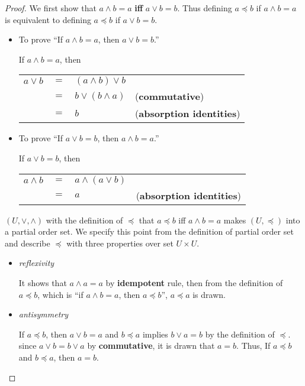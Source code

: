 \begin{proof}
\label{prf:latticeTheorem2}
We first show that $a \wedge b = a$ \textbf{iff} $a \vee b = b$. Thus defining $a \preceq b$ if $a \wedge b = a$ is equivalent to defining $a \preceq b$ if $a \vee b = b$.
\begin{itemize}

\item To prove ``If $a \wedge b = a$, then $a \vee b = b$.''

If $a \wedge b = a$, then 

\begin{tabular}{l l l l}
$a \vee b$ & $ = $ & $(a \wedge b) \vee b$ & \\
           & $ = $ & $b \vee (b \wedge a)$ & (\textbf{commutative})\\
           & $ = $ & $b$ & (\textbf{absorption identities})  
\end{tabular}

\item To prove ``If $a \vee b = b$, then $a \wedge b = a$.''

If $a \vee b = b$, then

\begin{tabular}{l l l l}
$a \wedge b$ & $ = $ & $a \wedge (a \vee b)$ & \\
             & $ = $ & $a$ & (\textbf{absorption identities})
\end{tabular}
\end{itemize}

$(U,\vee,\wedge)$ with the definition of $\preceq$ that $a \preceq b$ iff $a \wedge b = a$ makes $(U,\preceq)$ into a partial order set. We specify this point from the definition of partial order set and describe $\preceq$ with three properties over set $U \times U$.
\begin{itemize}

\item \textit{reflexivity}
 
It shows that $a \wedge a = a$ by \textbf{idempotent} rule, then from the definition of $a \preceq b$, which is ``if $a \wedge b = a$, then $a \preceq b$'', $a \preceq a$ is drawn.

\item \textit{antisymmetry}

If $a \preceq b$, then $a \vee b = a$  and $b \preceq a$ implies $b \vee a = b$ by the definition of $\preceq$. since $a \vee b = b \vee a$ by \textbf{commutative}, it is drawn that $a=b$. Thus, If 
$a \preceq b$ and $b \preceq a$, then $a=b$.


\end{itemize}
\end{proof}
